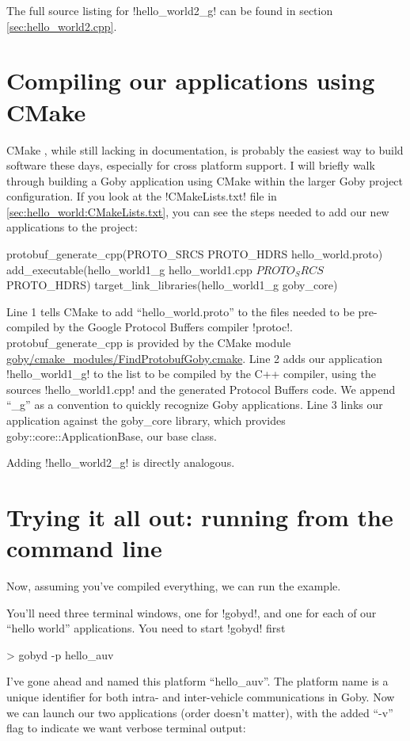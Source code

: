 The full source listing for !hello_world2_g! can be found in section \ref{sec:hello_world2.cpp}.

\section{Compiling our applications using CMake}

CMake \cite{cmake}, while still lacking in documentation, is probably the easiest way to build software these days, especially for cross platform support. I will briefly walk through building a Goby application using CMake within the larger Goby project configuration. If you look at the !CMakeLists.txt! file in \ref{sec:hello_world:CMakeLists.txt}, you can see the steps needed to add our new applications to the project:

\begin{boxedverbatim}
protobuf_generate_cpp(PROTO_SRCS PROTO_HDRS hello_world.proto)
add_executable(hello_world1_g hello_world1.cpp ${PROTO_SRCS} ${PROTO_HDRS})
target_link_libraries(hello_world1_g goby_core)
\end{boxedverbatim}
\resetbvlinenumber

Line 1 tells CMake to add ``hello\_world.proto'' to the files needed to be pre-compiled by the Google Protocol Buffers compiler !protoc!. protobuf\_generate\_cpp is provided by the CMake module \href{http://bazaar.launchpad.net/~goby-dev/goby/trunk/annotate/head:/cmake_modules/FindProtobufGoby.cmake}{goby/cmake\_modules/FindProtobufGoby.cmake}. Line 2 adds our application !hello_world1_g! to the list to be compiled by the C++ compiler, using the sources !hello_world1.cpp! and the generated Protocol Buffers code. We append ``\_g'' as a convention to quickly recognize Goby applications. Line 3 links our application against the goby\_core library, which provides goby::core::ApplicationBase, our base class.

Adding !hello_world2_g! is directly analogous.

\section{Trying it all out: running from the command line}

Now, assuming you've compiled everything, we can run the example.

You'll need three terminal windows, one for !gobyd!, and one for each of our ``hello world'' applications. You need to start !gobyd! first
\begin{boxedverbatim}
> gobyd -p hello_auv
\end{boxedverbatim}
\resetbvlinenumber
I've gone ahead and named this platform ``hello\_auv''. The platform name is a unique identifier for both intra- and inter-vehicle communications in Goby. Now we can launch our two applications (order doesn't matter), with the added ``-v'' flag to indicate we want verbose terminal output:

